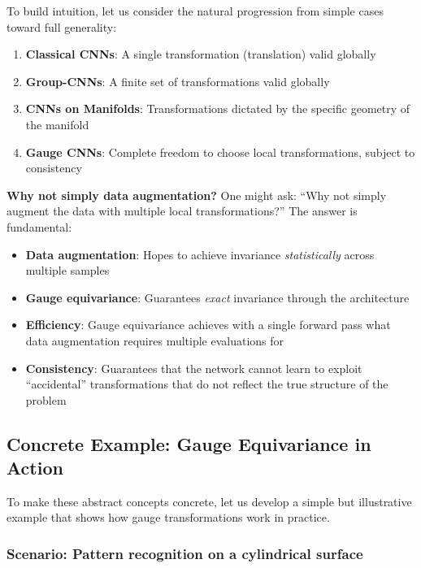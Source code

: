 To build intuition, let us consider the natural progression from simple cases toward full generality:

\begin{enumerate}
    \item \textbf{Classical CNNs}: A single transformation (translation) valid globally
    \item \textbf{Group-CNNs}: A finite set of transformations valid globally
    \item \textbf{CNNs on Manifolds}: Transformations dictated by the specific geometry of the manifold
    \item \textbf{Gauge CNNs}: Complete freedom to choose local transformations, subject to consistency
\end{enumerate}

\textbf{Why not simply data augmentation?} One might ask: ``Why not simply augment the data with multiple local transformations?'' The answer is fundamental:

\begin{itemize}
    \item \textbf{Data augmentation}: Hopes to achieve invariance \textit{statistically} across multiple samples
    \item \textbf{Gauge equivariance}: Guarantees \textit{exact} invariance through the architecture
    \item \textbf{Efficiency}: Gauge equivariance achieves with a single forward pass what data augmentation requires multiple evaluations for
    \item \textbf{Consistency}: Guarantees that the network cannot learn to exploit ``accidental'' transformations that do not reflect the true structure of the problem
\end{itemize}

\subsection{Concrete Example: Gauge Equivariance in Action}\label{subsec:ejemplo_gauge_equivarianza}

To make these abstract concepts concrete, let us develop a simple but illustrative example that shows how gauge transformations work in practice.

\subsubsection{Scenario: Pattern recognition on a cylindrical surface}

